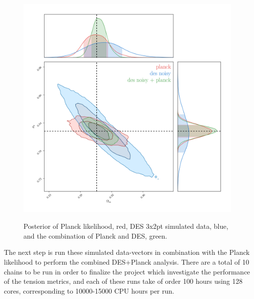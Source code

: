 \documentclass[12pt]{article}
\begin{document}
\begin{small}

\begin{figure}[h!]
\begin{center}
\includegraphics[height=12cm]{des+planck_poly2D.png}
\end{center}
 \caption{Posterior of Planck likelihood, red, DES 3x2pt simulated data, blue, and the combination of Planck and DES, green.}
\label{figure1}
\end{figure}

The next step is run these simulated data-vectors in combination with the Planck likelihood to perform the combined DES+Planck analysis. There are a total of 10 chains to be run in order to finalize the project which investigate the performance of the tension metrics, and each of these runs take of order 100 hours using 128 cores, corresponding to 10000-15000 CPU hours per run.


\end{small}
\end{document}
